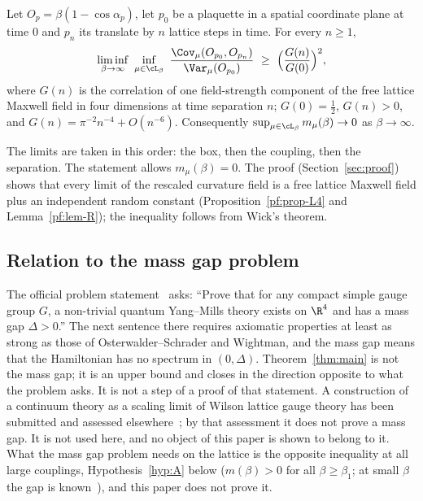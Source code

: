 \begin{theorem}\label{thm:main}
Let $O_p=\beta(1-\cos\alpha_p)$, let $p_0$ be a plaquette in a spatial coordinate plane at time $0$ and $p_n$ its translate by $n$ lattice steps in time. For every $n\ge 1$,
\[
\liminf_{\beta\to\infty}\ \inf_{\mu\in\cL_\beta}\ \frac{\Cov_\mu(O_{p_0},O_{p_n})}{\Var_\mu(O_{p_0})}\ \ge\ \Bigl(\frac{G(n)}{G(0)}\Bigr)^{2},
\]
where $G(n)$ is the correlation of one field-strength component of the free lattice Maxwell field in four dimensions at time separation $n$; $G(0)=\tfrac12$, $G(n)>0$, and $G(n)=\pi^{-2}n^{-4}+O(n^{-6})$. Consequently $\sup_{\mu\in\cL_\beta}m_\mu(\beta)\to 0$ as $\beta\to\infty$.
\end{theorem}

The limits are taken in this order: the box, then the coupling, then the separation. The statement allows $m_\mu(\beta)=0$. The proof (Section~\ref{sec:proof}) shows that every limit of the rescaled curvature field is a free lattice Maxwell field plus an independent random constant (Proposition~\ref{pf:prop-L4} and Lemma~\ref{pf:lem-R}); the inequality follows from Wick's theorem.

\subsection*{Relation to the mass gap problem}
The official problem statement~\cite[p.~6]{JW} asks: ``Prove that for any compact simple gauge group $G$, a non-trivial quantum Yang--Mills theory exists on $\R^4$ and has a mass gap $\Delta>0$.'' The next sentence there requires axiomatic properties at least as strong as those of Osterwalder--Schrader and Wightman, and the mass gap means that the Hamiltonian has no spectrum in $(0,\Delta)$. Theorem~\ref{thm:main} is not the mass gap; it is an upper bound and closes in the direction opposite to what the problem asks. It is not a step of a proof of that statement. A construction of a continuum theory as a scaling limit of Wilson lattice gauge theory has been submitted and assessed elsewhere~\cite{YMG}; by that assessment it does not prove a mass gap. It is not used here, and no object of this paper is shown to belong to it. What the mass gap problem needs on the lattice is the opposite inequality at all large couplings, Hypothesis~\ref{hyp:A} below ($m(\beta)>0$ for all $\beta\ge\beta_1$; at small $\beta$ the gap is known~\cite{OS78}), and this paper does not prove it.

